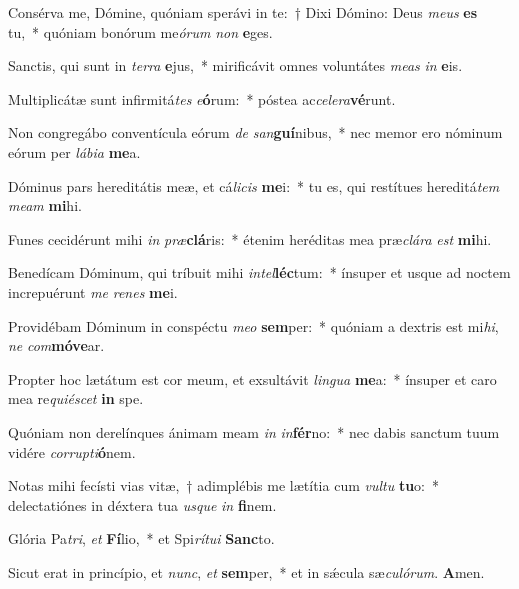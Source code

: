\item Consérva me, Dómine, quóniam sperávi in te:~† Dixi Dómino: Deus \textit{me}\textit{us} \textbf{es} tu,~* quóniam bonórum me\textit{ó}\textit{rum} \textit{non} \textbf{e}ges.
\item Sanctis, qui sunt in \textit{ter}\textit{ra} \textbf{e}jus,~* mirificávit omnes voluntátes \textit{me}\textit{as} \textit{in} \textbf{e}is.
\item Multiplicátæ sunt infirmitá\textit{tes} \textit{e}\textbf{ó}rum:~* póstea ac\textit{ce}\textit{le}\textit{ra}\textbf{vé}runt.
\item Non congregábo conventícula eórum \textit{de} \textit{san}\textbf{guí}nibus,~* nec memor ero nóminum eórum per \textit{lá}\textit{bi}\textit{a} \textbf{me}a.
\item Dóminus pars hereditátis meæ, et cá\textit{li}\textit{cis} \textbf{me}i:~* tu es, qui restítues hereditá\textit{tem} \textit{me}\textit{am} \textbf{mi}hi.
\item Funes cecidérunt mihi \textit{in} \textit{præ}\textbf{clá}ris:~* étenim heréditas mea præ\textit{clá}\textit{ra} \textit{est} \textbf{mi}hi.
\item Benedícam Dóminum, qui tríbuit mihi \textit{in}\textit{tel}\textbf{léc}tum:~* ínsuper et usque ad noctem increpuérunt \textit{me} \textit{re}\textit{nes} \textbf{me}i.
\item Providébam Dóminum in conspéctu \textit{me}\textit{o} \textbf{sem}per:~* quóniam a dextris est mi\textit{hi}, \textit{ne} \textit{com}\textbf{mó}\textbf{ve}ar.
\item Propter hoc lætátum est cor meum, et exsultávit \textit{lin}\textit{gua} \textbf{me}a:~* ínsuper et caro mea re\textit{qui}\textit{é}\textit{scet} \textbf{in} spe.
\item Quóniam non derelínques ánimam meam \textit{in} \textit{in}\textbf{fér}no:~* nec dabis sanctum tuum vidére \textit{cor}\textit{rup}\textit{ti}\textbf{ó}nem.
\item Notas mihi fecísti vias vitæ,~† adimplébis me lætítia cum \textit{vul}\textit{tu} \textbf{tu}o:~* delectatiónes in déxtera tua \textit{us}\textit{que} \textit{in} \textbf{fi}nem.
\item Glória Pa\textit{tri}, \textit{et} \textbf{Fí}lio,~* et Spi\textit{rí}\textit{tu}\textit{i} \textbf{Sanc}to.
\item Sicut erat in princípio, et \textit{nunc}, \textit{et} \textbf{sem}per,~* et in sǽcula sæ\textit{cu}\textit{ló}\textit{rum}. \textbf{A}men.
